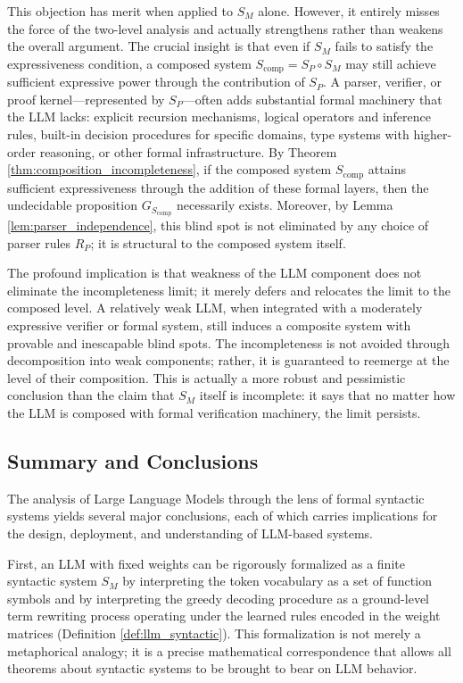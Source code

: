 \documentclass[11pt]{article}
\begin{document}
This objection has merit when applied to $S_M$ alone. However, it entirely misses the force of the two-level analysis and actually strengthens rather than weakens the overall argument. The crucial insight is that even if $S_M$ fails to satisfy the expressiveness condition, a composed system $S_{\text{comp}} = S_P \circ S_M$ may still achieve sufficient expressive power through the contribution of $S_P$. A parser, verifier, or proof kernel—represented by $S_P$—often adds substantial formal machinery that the LLM lacks: explicit recursion mechanisms, logical operators and inference rules, built-in decision procedures for specific domains, type systems with higher-order reasoning, or other formal infrastructure. By Theorem \ref{thm:composition_incompleteness}, if the composed system $S_{\text{comp}}$ attains sufficient expressiveness through the addition of these formal layers, then the undecidable proposition $G_{S_{\text{comp}}}$ necessarily exists. Moreover, by Lemma \ref{lem:parser_independence}, this blind spot is not eliminated by any choice of parser rules $R_P$; it is structural to the composed system itself.

The profound implication is that weakness of the LLM component does not eliminate the incompleteness limit; it merely defers and relocates the limit to the composed level. A relatively weak LLM, when integrated with a moderately expressive verifier or formal system, still induces a composite system with provable and inescapable blind spots. The incompleteness is not avoided through decomposition into weak components; rather, it is guaranteed to reemerge at the level of their composition. This is actually a more robust and pessimistic conclusion than the claim that $S_M$ itself is incomplete: it says that no matter how the LLM is composed with formal verification machinery, the limit persists.

\subsection{Summary and Conclusions}
\label{subsec:summary_llm}

The analysis of Large Language Models through the lens of formal syntactic systems yields several major conclusions, each of which carries implications for the design, deployment, and understanding of LLM-based systems.

First, an LLM with fixed weights can be rigorously formalized as a finite syntactic system $S_M$ by interpreting the token vocabulary as a set of function symbols and by interpreting the greedy decoding procedure as a ground-level term rewriting process operating under the learned rules encoded in the weight matrices (Definition \ref{def:llm_syntactic}). This formalization is not merely a metaphorical analogy; it is a precise mathematical correspondence that allows all theorems about syntactic systems to be brought to bear on LLM behavior.
\end{document}
